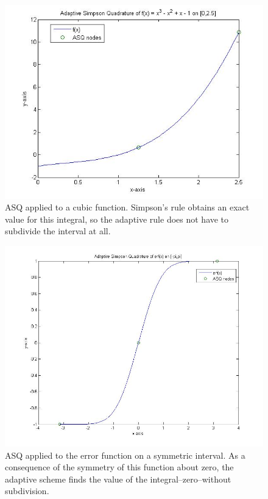 \begin{center}
\begin{figure}[H]
  \includegraphics[width=450px]{graphics/cubic_integral_adaptive_simps.jpg}
  \caption[ASQ applied to a cubic function]{ASQ applied to a cubic function. Simpson's rule obtains an exact value for this integral, so the adaptive rule does not 
  have to subdivide the interval at all.}
\end{figure}

\begin{figure}[H]
  \includegraphics[width=550px]{graphics/erf_adaptive_simps1.jpg}
  \caption[ASQ applied to the error function on a symmetric interval]{ASQ applied to the error function on a symmetric interval. As a consequence of the symmetry of this function about zero,
  the adaptive scheme finds the value of the integral--zero--without subdivision.}
\end{figure}


\end{center}

